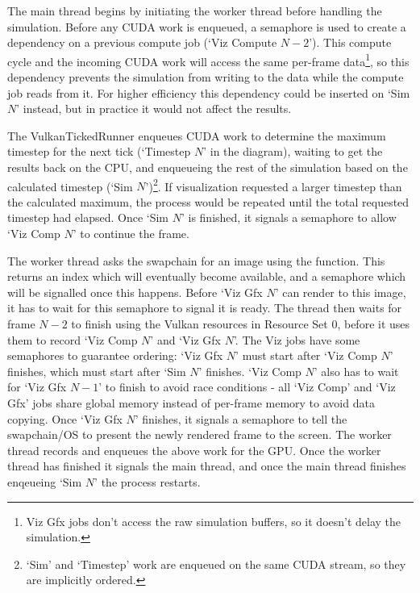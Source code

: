 The main thread begins by initiating the worker thread before handling the simulation.
Before any CUDA work is enqueued, a semaphore is used to create a dependency on a previous compute job (`Viz Compute $N - 2$'). %
This compute cycle and the incoming CUDA work will access the same per-frame data\footnote{Viz Gfx jobs don't access the raw simulation buffers, so it doesn't delay the simulation.}, so this dependency prevents the simulation from writing to the data while the compute job reads from it.
For higher efficiency this dependency could be inserted on `Sim $N$' instead, but in practice it would not affect the results.

The VulkanTickedRunner enqueues CUDA work to determine the maximum timestep for the next tick (`Timestep $N$' in the diagram), waiting to get the results back on the CPU, and enqueueing the rest of the simulation based on the calculated timestep (`Sim $N$')\footnote{`Sim' and `Timestep' work are enqueued on the same CUDA stream, so they are implicitly ordered.}.%
If visualization requested a larger timestep than the calculated maximum, the process would be repeated until the total requested timestep had elapsed.
Once `Sim $N$' is finished, it signals a semaphore to allow `Viz Comp $N$' to continue the frame. %

The worker thread asks the swapchain for an image using the  function.
This returns an index which will eventually become available, and a semaphore which will be signalled once this happens.
Before `Viz Gfx $N$' can render to this image, it has to wait for this semaphore to signal it is ready. %
The thread then waits for frame $N-2$ to finish using the Vulkan resources in Resource Set 0, before it uses them to record `Viz Comp $N$' and `Viz Gfx $N$'. %
The Viz jobs have some semaphores to guarantee ordering:
`Viz Gfx $N$' must start after `Viz Comp $N$' finishes, which must start after `Sim $N$' finishes. %
`Viz Comp $N$' also has to wait for `Viz Gfx $N - 1$' to finish to avoid race conditions - all `Viz Comp' and `Viz Gfx' jobs share global memory instead of per-frame memory to avoid data copying. %
Once `Viz Gfx $N$' finishes, it signals a semaphore to tell the swapchain/OS to present the newly rendered frame to the screen.
The worker thread records and enqueues the above work for the GPU.
Once the worker thread has finished it signals the main thread, and once the main thread finishes enqeueing `Sim $N$' the process restarts.

